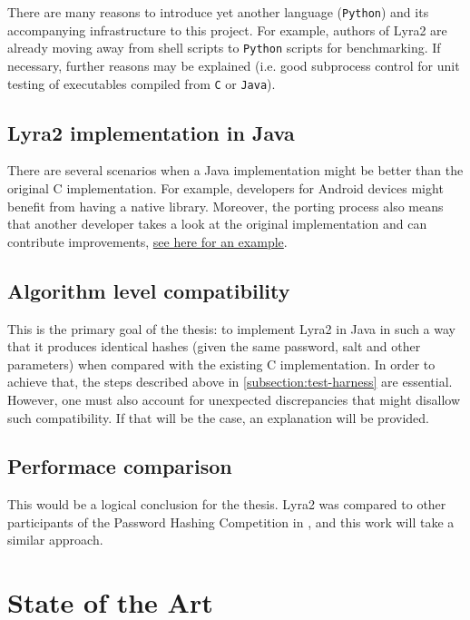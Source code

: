 \documentclass[a4paper,10pt,english]{INSOexpose}
\begin{document}
There are many reasons to introduce yet another language (\texttt{Python}) and its accompanying infrastructure to this project. For example, authors of Lyra2 are already moving away from shell scripts to \texttt{Python} scripts for benchmarking. If necessary, further reasons may be explained (i.e. good subprocess control for unit testing of executables compiled from \texttt{C} or \texttt{Java}).

\subsection{Lyra2 implementation in Java}

There are several scenarios when a Java implementation might be better than the original C implementation. For example, developers for Android devices might benefit from having a native library. Moreover, the porting process also means that another developer takes a look at the original implementation and can contribute improvements, \href{https://github.com/leocalm/Lyra/pull/6}{see here for an example}.

\subsection{Algorithm level compatibility}

This is the primary goal of the thesis: to implement Lyra2 in Java in such a way that it produces identical hashes (given the same password, salt and other parameters) when compared with the existing C implementation. In order to achieve that, the steps described above in \ref{subsection:test-harness} are essential. However, one must also account for unexpected discrepancies that might disallow such compatibility. If that will be the case, an explanation will be provided.

\subsection{Performace comparison}

This would be a logical conclusion for the thesis. Lyra2 was compared to other participants of the Password Hashing Competition in \cite{cryptoeprint:2015:265}, \cite{chang2015performance} and this work will take a similar approach.

\section{State of the Art}
\end{document}
